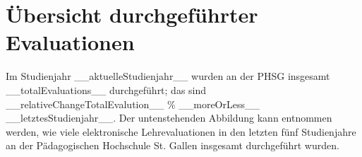 \documentclass[11pt]{article}
\begin{document}
\begin{titlepage}


\end{titlepage}


\pagestyle{fancy}
	\fancyhf{}
	\renewcommand{\headrulewidth}{0pt}



\section{Übersicht durchgeführter Evaluationen}
\label{sec: übersicht}
Im Studienjahr __aktuelleStudienjahr__ wurden an der PHSG insgesamt __totalEvaluations__ durchgeführt; das sind __relativeChangeTotalEvalution__ \% __moreOrLess__ __letztesStudienjahr__.
Der untenstehenden Abbildung kann entnommen werden, wie viele elektronische Lehrevaluationen in den letzten fünf Studienjahre an der Pädagogischen Hochschule St. Gallen insgesamt durchgeführt wurden.
\end{document}
